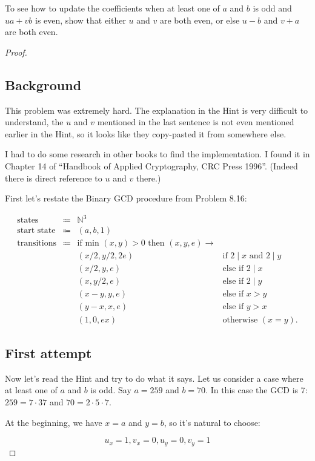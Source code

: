\documentclass[14pt]{extarticle}
\begin{document}
To see how to update the coefficients when at least one of $a$ and $b$ is odd and $ua + vb$ is even, show that either $u$ and $v$ are both even, or else $u - b$ and $v + a$ are both even.
\begin{proof}
\subsection{Background}
This problem was extremely hard. The explanation in the Hint is very difficult to understand, the $u$ and $v$ mentioned in the last sentence is not even mentioned earlier in the Hint, so it looks like they copy-pasted it from somewhere else. 

I had to do some research in other books to find the implementation. I found it in Chapter 14 of ``Handbook of Applied Cryptography, CRC Press 1996''. (Indeed there is direct reference to $u$ and $v$ there.)

First let's restate the Binary GCD procedure from Problem 8.16:

$$
\begin{array}{cccc}
\text{states} & \Coloneqq & \mathbb{N}^3 & \\
\text{start state} & \Coloneqq & (a,b,1) & \\
\text{transitions} & \Coloneqq & \text{if min }(x,y) > 0 \text{ then } (x,y,e) \to & \\
 & & (x/2, y/2, 2e) & \text{if } 2 \mid x \text{ and } 2 \mid y \\
 & & (x/2, y, e) & \text{else if } 2 \mid x \\
 & & (x, y/2, e) & \text{else if } 2 \mid y \\
 & & (x-y, y, e) & \text{else if } x > y \\
 & & (y-x, x, e) & \text{else if } y > x \\
 & & (1, 0, ex) & \text{otherwise } (x = y).
\end{array}
$$

\subsection{First attempt}
Now let's read the Hint and try to do what it says. Let us consider a case where at least one of $a$ and $b$ is odd. Say $a = 259$ and $b = 70$. In this case the GCD is 7: $259 = 7\cdot 37$ and $70 = 2\cdot 5 \cdot 7$.

At the beginning, we have $x = a$ and $y = b$, so it's natural to choose: 

$$
u_x = 1, v_x = 0, u_y = 0, v_y = 1
$$


\end{proof}
\end{document}
